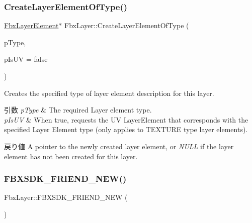 \subsubsection{\texorpdfstring{Create\+Layer\+Element\+Of\+Type()}{CreateLayerElementOfType()}}
{\footnotesize\ttfamily \hyperlink{class_fbx_layer_element}{Fbx\+Layer\+Element}$\ast$ Fbx\+Layer\+::\+Create\+Layer\+Element\+Of\+Type (\begin{DoxyParamCaption}\item[{\hyperlink{class_fbx_layer_element_a8c95c5cd880b56c776acd379bd86f42c}{Fbx\+Layer\+Element\+::\+E\+Type}}]{p\+Type,  }\item[{bool}]{p\+Is\+UV = {\ttfamily false} }\end{DoxyParamCaption})}

Creates the specified type of layer element description for this layer. 
\begin{DoxyParams}{引数}
{\em p\+Type} & The required Layer element type. \\
\hline
{\em p\+Is\+UV} & When {\ttfamily true}, requests the UV Layer\+Element that corresponds with the specified Layer Element type (only applies to T\+E\+X\+T\+U\+RE type layer elements). \\
\hline
\end{DoxyParams}
\begin{DoxyReturn}{戻り値}
A pointer to the newly created layer element, or {\itshape N\+U\+LL} if the layer element has not been created for this layer. 
\end{DoxyReturn}
\mbox{\label{class_fbx_layer_aef0025e8973e9d11b79ff7f7f9388963}} 
\subsubsection{\texorpdfstring{F\+B\+X\+S\+D\+K\+\_\+\+F\+R\+I\+E\+N\+D\+\_\+\+N\+E\+W()}{FBXSDK\_FRIEND\_NEW()}}
{\footnotesize\ttfamily Fbx\+Layer\+::\+F\+B\+X\+S\+D\+K\+\_\+\+F\+R\+I\+E\+N\+D\+\_\+\+N\+EW (\begin{DoxyParamCaption}{ }\end{DoxyParamCaption})}

\mbox{\label{class_fbx_layer_a9b089342d79d32531aa27ec83b71a43d}} 
